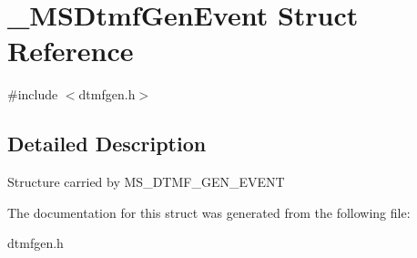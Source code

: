\section{\_\-MSDtmfGenEvent Struct Reference}
\label{struct__MSDtmfGenEvent}


{\ttfamily \#include $<$dtmfgen.h$>$}

\subsection{Detailed Description}
Structure carried by MS\_\-DTMF\_\-GEN\_\-EVENT 

The documentation for this struct was generated from the following file:\begin{DoxyCompactItemize}
\item 
dtmfgen.h\end{DoxyCompactItemize}
